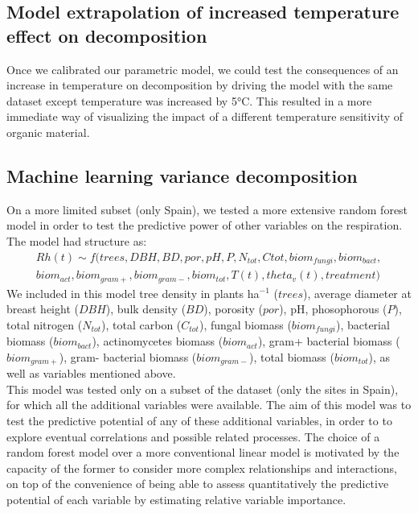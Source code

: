 \documentclass[
]{article}
\begin{document}
\subsection{Model extrapolation of increased temperature effect on decomposition}\label{model-extrapolation-of-increased-temperature-effect-on-decomposition}

Once we calibrated our parametric model, we could test the consequences of an increase in temperature on decomposition by driving the model with the same dataset except temperature was increased by 5°C. This resulted in a more immediate way of visualizing the impact of a different temperature sensitivity of organic material.

\subsection{Machine learning variance decomposition}\label{machine-learning-variance-decomposition}

On a more limited subset (only Spain), we tested a more extensive random forest model in order to test the predictive power of other variables on the respiration. The model had structure as:\\
\[
\begin{aligned}
Rh(t) \sim f(trees, DBH, BD, por, pH, P, N_{tot}, C{tot}, biom_{fungi}, biom_{bact}, \\
biom_{act}, biom_{gram+}, biom_{gram-}, biom_{tot}, T(t), theta_v(t), treatment)
\end{aligned}
\]
We included in this model tree density in plants ha\(^{-1}\) (\(trees\)), average diameter at breast height (\(DBH\)), bulk density (\(BD\)), porosity (\(por\)), pH, phosophorous (\(P\)), total nitrogen (\(N_{tot}\)), total carbon (\(C_{tot}\)), fungal biomass (\(biom_{fungi}\)), bacterial biomass (\(biom_{bact}\)), actinomycetes biomass (\(biom_{act}\)), gram+ bacterial biomass (\(biom_{gram+}\)), gram- bacterial biomass (\(biom_{gram-}\)), total biomass (\(biom_{tot}\)), as well as variables mentioned above.\\
This model was tested only on a subset of the dataset (only the sites in Spain), for which all the additional variables were available.
The aim of this model was to test the predictive potential of any of these additional variables, in order to to explore eventual correlations and possible related processes. The choice of a random forest model over a more conventional linear model is motivated by the capacity of the former to consider more complex relationships and interactions, on top of the convenience of being able to assess quantitatively the predictive potential of each variable by estimating relative variable importance.
\end{document}
